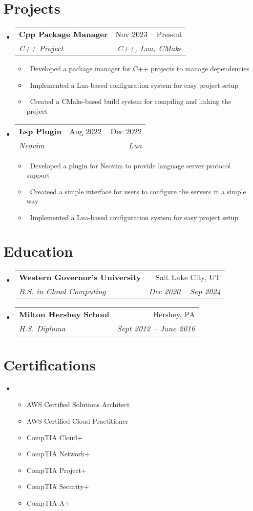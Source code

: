 \documentclass[letterpaper,10pt]{article}
\makeatletter
\newcommand{\resumeItem}[1]{\item\small{#1}}
\newcommand{\resumeSubheading}[4]{
\vspace{-1pt}\item
  \begin{tabular*}{0.97\textwidth}[t]{l@{\extracolsep{\fill}}r}
    \textbf{#1} & #2 \\
    \textit{#3} & \textit{#4} \\
  \end{tabular*}\vspace{-7pt}
}
\newcommand{\resumeSubHeadingList}{\begin{itemize}[leftmargin=0.15in, label={}]}
\newcommand{\resumeSubHeadingListEnd}{\end{itemize}}
\makeatother
\begin{document}
\section{Projects}
\resumeSubHeadingList
  \resumeSubheading
      {Cpp Package Manager}{Nov 2023 -- Present}
      {C++ Project}{C++, Lua, CMake}
      \resumeSubHeadingList
          \resumeItem{\textbullet\ Developed a package manager for C++ projects to manage dependencies}
          \resumeItem{\textbullet\ Implemented a Lua-based configuration system for easy project setup}
          \resumeItem{\textbullet\ Created a CMake-based build system for compiling and linking the project}
      \resumeSubHeadingListEnd
  \resumeSubheading
      {Lsp Plugin}{Aug 2022 -- Dec 2022} 
      {Neovim}{Lua}
      \resumeSubHeadingList
          \resumeItem{\textbullet\ Developed a plugin for Neovim to provide language server protocol support}
          \resumeItem{\textbullet\ Createed a simple interface for users to configure the servers in a simple way}
          \resumeItem{\textbullet\ Implemented a Lua-based configuration system for easy project setup}
      \resumeSubHeadingListEnd
\resumeSubHeadingListEnd

\section{Education}
\resumeSubHeadingList
  \resumeSubheading
      {Western Governor's University}{Salt Lake City, UT}
      {B.S. in Cloud Computing}{Dec 2020 -- Sep 2024}
  \resumeSubheading
      {Milton Hershey School}{Hershey, PA}
      {H.S. Diploma}{Sept 2012 -- June 2016}


\resumeSubHeadingListEnd
\section{Certifications}
\resumeSubHeadingList
  \resumeItem{
  \begin{itemize}
    \item AWS Certified Solutions Architect
    \item AWS Certified Cloud Practitioner
    \item CompTIA Cloud+
    \item CompTIA Network+
    \item CompTIA Project+
    \item CompTIA Security+
    \item CompTIA A+
  \end{itemize}}

\resumeSubHeadingListEnd
\end{document}
